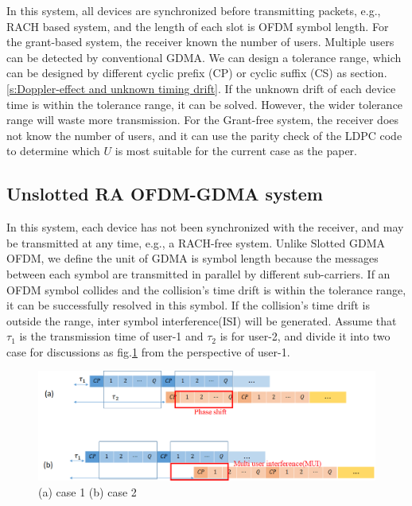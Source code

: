In this system, all devices are synchronized before transmitting packets, e.g., RACH based system, and the length of each slot is OFDM symbol length. For the grant-based system, the receiver known the number of users. Multiple users can be detected by conventional GDMA. We can design a tolerance range, which can be designed by different cyclic prefix (CP) or cyclic suffix (CS) as section.\ref{s:Doppler-effect and unknown timing drift}. If the unknown drift of each device time is within the tolerance range, it can be solved. However, the wider tolerance range will waste more transmission. For the Grant-free system, the receiver does not know the number of users, and it can use the parity check of the LDPC code to determine which $U$ is most suitable for the current case as the paper\cite{hsu2020uplink}.


\subsection{Unslotted RA OFDM-GDMA system}

In this system, each device has not been synchronized with the receiver, and may be transmitted at any time, e.g., a RACH-free system. Unlike Slotted GDMA OFDM, we define the unit of GDMA is symbol length because the messages between each symbol are transmitted in parallel by different sub-carriers. If an OFDM symbol collides and the collision's time drift is within the tolerance range, it can be successfully resolved in this symbol. If the collision's time drift is outside the range, inter symbol interference(ISI) will be generated. Assume that $\tau_{1}$ is the transmission time of user-1 and $\tau_2$ is for user-2, and divide it into two case for discussions as fig.\ref{fig:RACH_unslotted_collision} from the perspective of user-1.

\begin{figure}[b!]
 \centering
 \includegraphics[width=15cm]{fig/RACH_unslotted_collision.png}
 \caption{(a) case 1 (b) case 2}
 \label{fig:RACH_unslotted_collision}
\end{figure}

